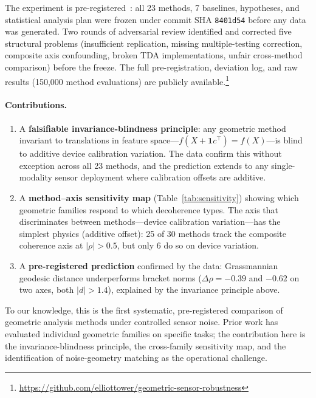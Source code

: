 \documentclass[11pt]{article}
\begin{document}
The experiment is
pre-registered~\citep{nosek2018preregistration,simmons2011false}: all
23 methods, 7 baselines, hypotheses, and statistical analysis plan were
frozen under commit SHA
\texttt{8401d54} before any data was generated.  Two rounds of
adversarial review identified and corrected five structural problems
(insufficient replication, missing multiple-testing correction, composite
axis confounding, broken TDA implementations, unfair cross-method
comparison) before the freeze.  The full pre-registration, deviation
log, and raw results (150,000 method evaluations) are publicly
available.\footnote{\url{https://github.com/elliottower/geometric-sensor-robustness}}

\paragraph{Contributions.}
\begin{enumerate}
  \item A \textbf{falsifiable invariance-blindness principle}: any
    geometric method invariant to translations in feature space---$f(X +
    \mathbf{1}c^\top) = f(X)$---is blind to additive device calibration
    variation.  The data confirm this without exception across all 23
    methods, and the prediction extends to any single-modality sensor
    deployment where calibration offsets are additive.
  \item A \textbf{method--axis sensitivity map} (Table~\ref{tab:sensitivity})
    showing which geometric families respond to which decoherence types.
    The axis that discriminates between methods---device calibration
    variation---has the simplest physics (additive offset): 25 of 30
    methods track the composite coherence axis at $|\rho| > 0.5$, but
    only 6 do so on device variation.
  \item A \textbf{pre-registered prediction} confirmed by the data:
    Grassmannian geodesic distance underperforms bracket norms
    ($\Delta\rho = -0.39$ and $-0.62$ on two axes, both $|d| > 1.4$),
    explained by the invariance principle above.
\end{enumerate}

To our knowledge, this is the first systematic, pre-registered
comparison of geometric analysis methods under controlled sensor noise.
Prior work has evaluated individual geometric families on specific
tasks; the contribution here is the invariance-blindness principle, the
cross-family sensitivity map, and the identification of noise-geometry
matching as the operational challenge.
\end{document}
